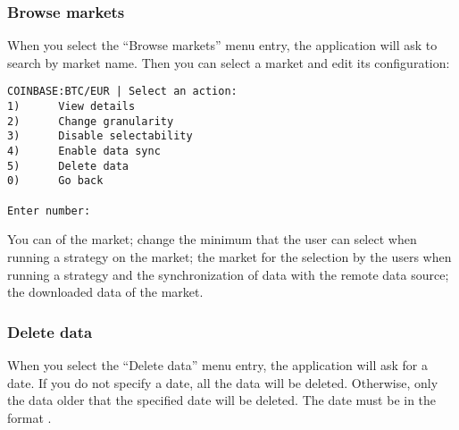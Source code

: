 \subsubsection{Browse markets}

When you select the ``Browse markets'' menu entry, the application will ask to
search by market name. Then you can select a market and edit its configuration:

\begin{verbatim}
COINBASE:BTC/EUR | Select an action:
1)      View details
2)      Change granularity
3)      Disable selectability
4)      Enable data sync
5)      Delete data
0)      Go back

Enter number:
\end{verbatim}

You can  of the market; change the minimum
 that the user can select when running a strategy on the
market;  the market for the selection by the users
when running a strategy and the synchronization of data with the remote data
source;  the downloaded data of the market.

\subsubsection{Delete data}

When you select the ``Delete data'' menu entry, the application will ask for a
date. If you do not specify a date, all the data will be deleted. Otherwise,
only the data older that the specified date will be deleted. The date must be in
the format  .
